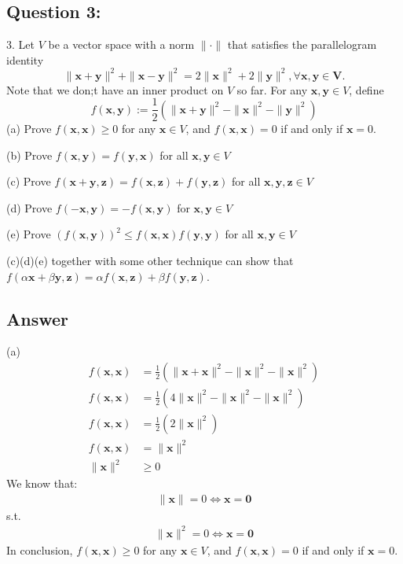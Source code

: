 \documentclass[a4paper,12pt]{article}
\begin{document}
\subsection*{Question 3:}
3. Let \(V\) be a vector space with a norm \(\|\cdot\|\) that satisfies the parallelogram identity
\[
    \|\bm{x} + \bm{y}\|^2 + \|\bm{x} - \bm{y}\|^2 = 2\|\bm{x}\|^2 + 2\|\bm{y}\|^2, \forall \bm{x}, \bm{y} \in \bm{V}.
\]
Note that we don;t have an inner product on \(V\) so far. For any \(\bm{x},\bm{y} \in V\), define
\[
    f(\bm{x}, \bm{y}) := \frac 1 2 (\|\bm{x} + \bm{y}\|^2 - \|\bm{x}\|^2 - \|\bm{y}\|^2)
\]
(a) Prove \(f(\bm{x}, \bm{x}) \geq 0\) for any \(\bm{x} \in V\), and \(f(\bm{x}, \bm{x}) = 0\) if and only if \(\bm{x} = 0\).

(b) Prove \(f(\bm{x}, \bm{y}) = f(\bm{y}, \bm{x})\) for all \(\bm{x}, \bm{y} \in V\)

(c) Prove \(f(\bm{x}+\bm{y}, \bm{z}) = f(\bm{x}, \bm{z}) + f(\bm{y}, \bm{z})\) for all \( \bm{x}, \bm{y}, \bm{z}\in V\)

(d) Prove \(f(-\bm{x}, \bm{y}) = -f(\bm{x}, \bm{y})\) for \(\bm{x}, \bm{y}\in V\)

(e) Prove \((f(\bm{x}, \bm{y}))^2 \leq f(\bm{x}, \bm{x})f(\bm{y}, \bm{y})\) for all \(\bm{x}, \bm{y} \in V\)

(c)(d)(e) together with some other technique can show that \(f(\alpha \bm{x} + \beta \bm{y}, \bm{z})  = \alpha f(\bm{x}, \bm{z}) + \beta f(\bm{y}, \bm{z})\).

\subsection*{Answer}
(a) 
\begin{align*}
    f(\bm{x}, \bm{x}) &= \frac 1 2 (\|\bm{x}+\bm{x}\|^2 - \|\bm{x}\|^2 - \|\bm{x}\|^2 ) \\
    f(\bm{x}, \bm{x}) &= \frac 1 2 (4\|\bm{x}\|^2 - \|\bm{x}\|^2 - \|\bm{x}\|^2 ) \\
    f(\bm{x}, \bm{x}) &= \frac 1 2 (2\|\bm{x}\|^2) \\
    f(\bm{x}, \bm{x}) &= \|\bm{x}\|^2 \\
    \|\bm{x}\|^2 &\geq 0 
\end{align*}
We know that:
\begin{align}
    \|\bm{x}\| = 0 \iff \bm{x} = \bm{0}
\end{align}
s.t.
\begin{align*}
    \|\bm{x}\|^2 = 0 \iff \bm{x} = \bm{0}
\end{align*}
In conclusion, \(f(\bm{x}, \bm{x}) \geq 0\) for any \(\bm{x} \in V\), and \(f(\bm{x}, \bm{x}) = 0\) if and only if \(\bm{x} = 0\).
\end{document}
